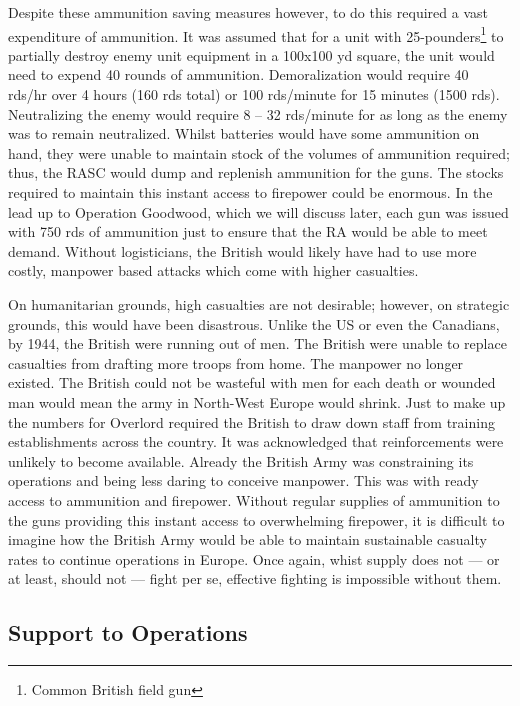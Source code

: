 \documentclass[noraggedright]{turabian-researchpaper}
\begin{document}
Despite these ammunition saving measures however, to do this required a vast 
expenditure of ammunition.  It was assumed that for a unit with
25-pounders\footnote{Common British field gun} to partially destroy enemy unit
equipment in a 100x100 yd square, the unit would need to expend 40 rounds of
ammunition.  Demoralization would require 40 rds/hr over 4 hours (160 rds 
total) or 100 rds/minute for 15 minutes (1500 rds).  Neutralizing the enemy 
would require 8 -- 32 rds/minute for as long as the enemy was to remain 
neutralized.\autocite[133]{gunfire}  Whilst batteries would have some
ammunition on hand, %
they were unable to maintain stock of the volumes of ammunition required; thus,
the RASC would dump and replenish ammunition for the guns.  
The stocks required to maintain this instant access to firepower could be 
enormous.  In the lead up to Operation Goodwood, which we will discuss later,
each gun was issued with 750 rds of ammunition just to ensure that the RA would
be able to meet demand.  Without logisticians, the British would likely have 
had to use more costly, manpower based attacks which come with higher 
casualties.  

On humanitarian grounds, high casualties are not desirable; however, on 
strategic grounds, this would have been disastrous.  Unlike the US or
even the Canadians, by 1944, the British were running out of men.  The 
British were unable to replace casualties from drafting more troops from 
home.  The manpower no longer existed.  The British could not be wasteful 
with men for each death or wounded man would mean the army in North-West 
Europe would shrink.  %
Just to make up the numbers for Overlord required the British to draw down
staff from training establishments across the country.  It was acknowledged
that reinforcements were unlikely to become available. %
Already the British Army was constraining its operations and being less 
daring to conceive manpower.  This was with ready access to ammunition and
firepower.  Without regular supplies of ammunition to the guns providing this
instant access to overwhelming firepower, it is difficult to imagine how the 
British Army would be able to maintain sustainable casualty rates to continue
operations in Europe.  Once again, whist supply does not --- or at least,
should not --- fight per se, effective fighting is impossible without them.



	\subsection{Support to Operations}
		
\end{document}

